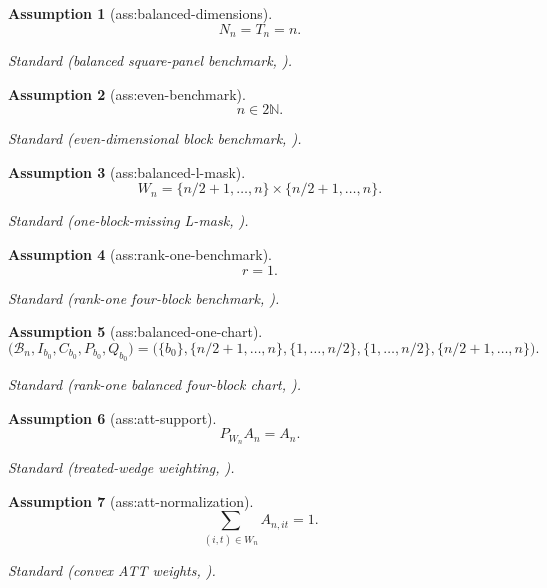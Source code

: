 \documentclass{article}
\newtheorem{assumption}{Assumption}
\begin{document}
\begin{assumption}[ass:balanced-dimensions]\label{ass:balanced-dimensions}
\[N_n=T_n=n.\]
\par\smallskip\noindent\emph{Standard} (balanced square-panel benchmark, \cite{CapponiStojnic2024}).
\end{assumption}

\begin{assumption}[ass:even-benchmark]\label{ass:even-benchmark}
\[n\in2\mathbb N.\]
\par\smallskip\noindent\emph{Standard} (even-dimensional block benchmark, \cite{CapponiStojnic2024}).
\end{assumption}

\begin{assumption}[ass:balanced-l-mask]\label{ass:balanced-l-mask}
\[W_n=\{n/2+1,\ldots,n\}\times\{n/2+1,\ldots,n\}.\]
\par\smallskip\noindent\emph{Standard} (one-block-missing L-mask, \cite{CapponiStojnic2024}).
\end{assumption}

\begin{assumption}[ass:rank-one-benchmark]\label{ass:rank-one-benchmark}
\[r=1.\]
\par\smallskip\noindent\emph{Standard} (rank-one four-block benchmark, \cite{YanWainwright2024}).
\end{assumption}

\begin{assumption}[ass:balanced-one-chart]\label{ass:balanced-one-chart}
\[\bigl(\mathcal B_n,I_{b_0},C_{b_0},P_{b_0},Q_{b_0}\bigr)=\bigl(\{b_0\},\{n/2+1,\ldots,n\},\{1,\ldots,n/2\},\{1,\ldots,n/2\},\{n/2+1,\ldots,n\}\bigr).\]
\par\smallskip\noindent\emph{Standard} (rank-one balanced four-block chart, \cite{YanWainwright2024}).
\end{assumption}

\begin{assumption}[ass:att-support]\label{ass:att-support}
\[P_{W_n}A_n=A_n.\]
\par\smallskip\noindent\emph{Standard} (treated-wedge weighting, \cite{XiaYanWainwright2024}).
\end{assumption}

\begin{assumption}[ass:att-normalization]\label{ass:att-normalization}
\[\sum_{(i,t)\in W_n}A_{n,it}=1.\]
\par\smallskip\noindent\emph{Standard} (convex ATT weights, \cite{FariasLiPeng2021}).
\end{assumption}
\end{document}
